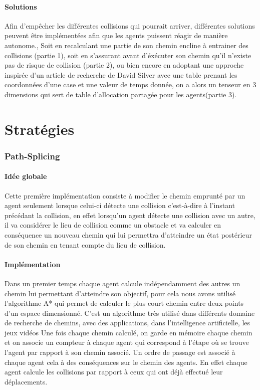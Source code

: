 \documentclass{article}
\begin{document}
			\subsection{Solutions}
				Afin d'empêcher les différentes collisions qui pourrait arriver, différentes solutions peuvent être implémentées afin que les agents puissent réagir de manière autonome., Soit en recalculant une partie de son chemin encline à entrainer des collisions (partie 1), soit en s'assurant avant d'éxécuter son chemin qu'il n'existe pas de risque de collision (partie 2), ou bien encore en adoptant une approche inspirée d'un article de recherche de David Silver avec une table prenant les coordonnées d'une case et une valeur de temps donnée, on a alors un tenseur en 3 dimensions qui sert de table d'allocation partagée pour les agents(partie 3).		
	\part{Stratégies}
	
		\section{Path-Splicing}
		
			\subsection{Idée globale}
			
			Cette première implémentation consiste à modifier le chemin emprunté par un agent seulement lorsque celui-ci détecte une collision c'est-à-dire à l'instant précédant la collision, en effet lorsqu'un agent détecte une collision avec un autre, il va considérer le lieu de collision comme un obstacle et va calculer en conséquence un nouveau chemin qui lui permettra d'atteindre un état postérieur de son chemin en tenant compte du lieu de collision.
			
			\subsection{Implémentation}
			
			Dans un premier temps chaque agent calcule indépendamment des autres un chemin lui permettant d'atteindre son objectif, pour cela nous avons utilisé l'algorithme A* qui permet de calculer le plus court chemin entre deux points d'un espace dimensionné.
			C'est un algorithme très utilisé dans différents domaine de recherche de chemins, avec des applications, dans l'intelligence artificielle, les jeux vidéos
			Une fois chaque chemin calculé, on garde en mémoire chaque chemin et on associe un compteur à chaque agent qui correspond à l'étape où se trouve l'agent par rapport à son chemin associé.
			Un ordre de passage est associé à chaque agent cela à des conséquences sur le chemin des agents. En effet chaque agent calcule les collisions par rapport à ceux qui ont déjà effectué leur déplacements.
			
\end{document}
